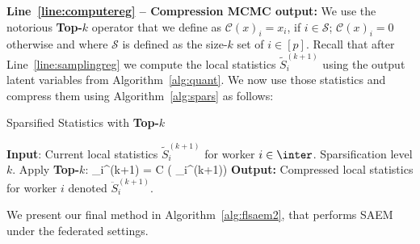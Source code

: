\documentclass[11pt]{article}
\theoremstyle{t}
\begin{document}
\noindent \textbf{Line~\ref{line:computereg} -- Compression MCMC output:}
We use the notorious \textbf{Top-$k$} operator that we define as $\mathcal C(x)_i=x_i$, if $i\in \mathcal S$; $\mathcal C(x)_i=0$ otherwise and where $\mathcal S$ is defined as the size-$k$ set of $i\in[p]$.
Recall that after Line~\ref{line:samplingreg} we compute the local statistics $\tilde{S}_{i}^{(k+1)}$ using the output latent variables from Algorithm~\ref{alg:quant}.
We now use those statistics and compress them using Algorithm~\ref{alg:spars} as follows:

\begin{algorithm}[H]
\caption{Sparsified Statistics with \textbf{Top-$k$}} \label{alg:spars}
\begin{algorithmic}[1]
\STATE \textbf{Input}: Current local statistics $\tilde{S}_{i}^{(k+1)}$ for worker $i \in \inter$. Sparsification level $k$.
\STATE Apply \textbf{Top-$k$}:
\beq\label{eq:topkstats}
_{i}^{(k+1)} = \mathcal C \left( _{i}^{(k+1)}\right)
\eeq
\STATE \textbf{Output:} Compressed local statistics for worker $i$ denoted $\ddot{S}_{i}^{(k+1)}$.
\end{algorithmic}
\end{algorithm}



We present our final method in Algorithm~\ref{alg:flsaem2}, that performs SAEM under the federated settings.
\end{document}
